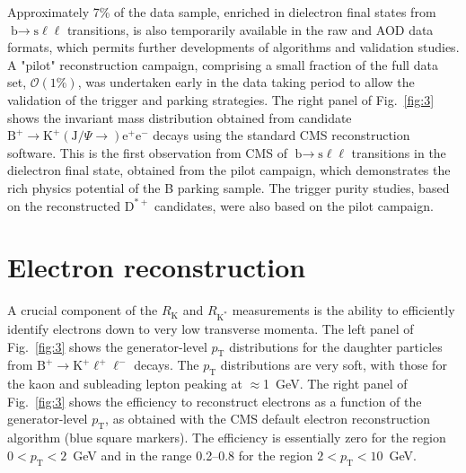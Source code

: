 \documentclass{webofc}
\newcommand{\kjpsi}{\ensuremath{(\textrm{J}/\Psi{\rightarrow})}\xspace}
\newcommand{\ellell}{\ensuremath{\ell^+\ell^-}\xspace}
\newcommand{\ee}{\ensuremath{\textrm{e}^+\textrm{e}^-}\xspace}
\newcommand{\bto}{\ensuremath{\textrm{b}{\rightarrow}}\xspace}
\newcommand{\btok}{\ensuremath{\textrm{B}^+{\rightarrow}\textrm{K}^+}\xspace}
\newcommand{\btokll}{\ensuremath{\btok\ellell}\xspace}
\newcommand{\btokjpsiee}{\ensuremath{\btok\kjpsi\ee}\xspace}
\newcommand{\rk}{\ensuremath{R_{\textrm{K}}}\xspace}
\newcommand{\rkst}{\ensuremath{R_{\textrm{K}^*}}\xspace}
\newcommand{\bsll}{\ensuremath{\bto\textrm{s}\ell\ell}\xspace}
\newcommand{\pt}{\ensuremath{p_\textrm{T}}\xspace}
\begin{document}
Approximately 7\% of the data sample, enriched in dielectron final
states from \bsll transitions, is also temporarily available in the
raw and AOD data formats, which permits further developments of
algorithms and validation studies. A "pilot" reconstruction campaign,
comprising a small fraction of the full data set, $\mathcal{O}(1\%)$,
was undertaken early in the data taking period to allow the validation
of the trigger and parking strategies. The right panel of
Fig.~\ref{fig:3} shows the invariant mass distribution obtained from
candidate \btokjpsiee decays using the standard CMS reconstruction
software. This is the first observation from CMS of \bsll transitions
in the dielectron final state, obtained from the pilot campaign, which
demonstrates the rich physics potential of the B parking sample. The
trigger purity studies, based on the reconstructed $\textrm{D}^{*+}$
candidates, were also based on the pilot campaign.

\section{Electron reconstruction}
\label{sec:5}

A crucial component of the \rk and \rkst measurements is the ability
to efficiently identify electrons down to very low transverse momenta.
The left panel of Fig.~\ref{fig:3} shows the generator-level \pt
distributions for the daughter particles from \btokll decays. The \pt
distributions are very soft, with those for the kaon and subleading
lepton peaking at ${\approx}$1~GeV. The right panel of
Fig.~\ref{fig:3} shows the efficiency to reconstruct electrons as a
function of the generator-level \pt, as obtained with the CMS default
electron reconstruction algorithm (blue square markers). The
efficiency is essentially zero for the region $0 < \pt < 2$~GeV and in
the range 0.2--0.8 for the region $2 < \pt < 10$~GeV.
\end{document}
